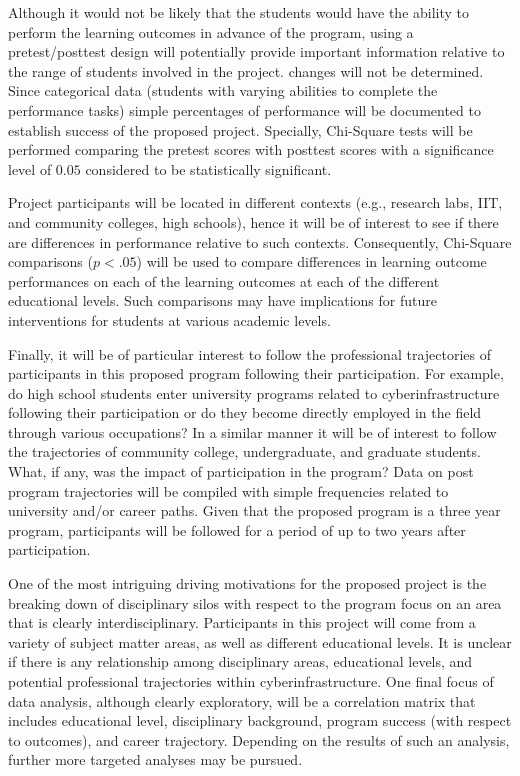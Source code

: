 \documentclass[11pt]{NSFamsart}
\begin{document}
Although it would not be likely that the students would have the ability to perform the learning outcomes in advance of the program, using a pretest/posttest design will potentially provide important information relative to the range of students involved in the project. changes will not be determined. Since categorical data (students with varying abilities to complete the performance tasks) simple percentages of performance will be documented to establish success of the proposed project. Specially, Chi-Square tests will be performed comparing the pretest scores with posttest scores with a significance level of $0.05$ considered to be statistically significant.

Project participants will be located in different contexts (e.g., research labs, IIT, and community colleges, high schools), hence it will be of interest to see if there are differences in performance relative to such contexts. Consequently, Chi-Square comparisons ($p<.05$) will be used to compare differences in learning outcome performances on each of the learning outcomes at each of the different educational levels. Such comparisons may have implications for future interventions for students at various academic levels.

Finally, it will be of particular interest to follow the professional trajectories of participants in this proposed program following their participation. For example, do high school students enter university programs related to cyberinfrastructure following their participation or do they become directly employed in the field through various occupations? In a similar manner it will be of interest to follow the trajectories of community college, undergraduate, and graduate students. What, if any, was the impact of participation in the program? Data on post program trajectories will be compiled with simple frequencies related to university and/or career paths. Given that the proposed program is a three year program, participants will be followed for a period of up to two years after participation.

One of the most intriguing driving motivations for the proposed project is the breaking down of disciplinary silos with respect to the program focus on an area that is clearly interdisciplinary. Participants in this project will come from a variety of subject matter areas, as well as different educational levels. It is unclear if there is any relationship among disciplinary areas, educational levels, and potential professional trajectories within cyberinfrastructure. One final focus of data analysis, although clearly exploratory, will be a correlation matrix that includes educational level, disciplinary background, program success (with respect to outcomes), and career trajectory. Depending on the results of such an analysis, further more targeted analyses may be pursued.
\end{document}
